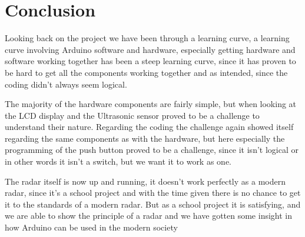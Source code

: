 \chapter{Conclusion}
Looking back on the project we have been through a learning curve, a learning curve involving Arduino software and hardware, especially getting hardware and software working together has been a steep learning curve, since it has proven to be hard to get all the components working together and as intended, since the coding didn't always seem logical. 

The majority of the hardware components are fairly simple, but when looking at the LCD display and the Ultrasonic sensor proved to be a challenge to understand their nature. Regarding the coding the challenge again showed itself regarding the same components as with the hardware, but here especially the programming of the push button proved to be a challenge, since it isn't logical or in other words it isn't a switch, but we want it to work as one. 

The radar itself is now up and running, it doesn’t work perfectly as a modern radar, since it’s a school project and with the time given there is no chance to get it to the standards of a modern radar. But as a school project it is satisfying, and we are able to show the principle of a radar and we have gotten some insight in how Arduino can be used in the modern society